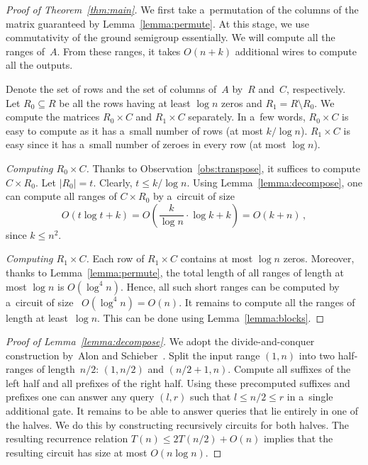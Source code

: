 \documentclass[11pt,letterpaper]{article}
\begin{document}
\begin{proof}[Proof of Theorem~\ref{thm:main}]
We first take a~permutation of the columns of the matrix
guaranteed by Lemma~\ref{lemma:permute}. At this stage,
we use commutativity of the ground semigroup essentially.
We will compute all the ranges of~$A$. From these ranges,
it takes $O(n+k)$ additional wires to compute all the outputs.

Denote the set of rows and the set of columns of~$A$ by~$R$
and~$C$, respectively. Let $R_0 \subseteq R$ be all the rows
having at least $\log n$ zeros and $R_1=R \setminus R_0$. We
compute the matrices $R_0 \times C$ and $R_1 \times C$
separately. In a~few words, $R_0 \times C$ is easy to compute
as it has a~small number of rows (at most $k/\log n$). $R_1 \times C$ is easy since it has a~small number of zeroes in
every row (at most $\log n$).

\emph{Computing $R_0 \times C$.} Thanks to
Observation~\ref{obs:transpose}, it suffices
to compute $C \times R_0$.
Let $|R_0|=t$. Clearly, $t \le k/\log n$.
Using Lemma~\ref{lemma:decompose}, one can compute all
ranges of $C \times R_0$ by a~circuit of size
\[O(t\log t+k)=O\left(\frac{k}{\log n} \cdot \log k+k\right)=O(k+n)\, ,\]
since $k \le n^2$.

\emph{Computing $R_1 \times C$.} Each row of
$R_1 \times C$ contains at most $\log n$ zeros. Moreover,
thanks to Lemma~\ref{lemma:permute}, the total length of all
ranges of length at most $\log n$ is $O(\log^4n)$. Hence, all
such short ranges can be computed by a~circuit of size~
$O(\log^4n)=O(n)$. It remains to compute all the ranges of
length at least~$\log n$. This can be done using Lemma~\ref{lemma:blocks}.
\end{proof}

\begin{proof}[Proof of Lemma~\ref{lemma:decompose}]
We adopt the divide-and-conquer construction by~Alon and Schieber~\cite{Alon87optimalpreprocessing}.
Split the input range $(1,n)$ into two half-ranges of
length~$n/2$:
$(1,n/2)$ and $(n/2+1,n)$.
Compute all suffixes of the left half and all prefixes of
the right half.
Using these precomputed suffixes and
prefixes one can answer any query $(l,r)$ such that $l \le n/2
\le r$ in a~single additional gate. It remains to be able to answer
queries that lie entirely in one of the halves. We do this by
constructing recursively circuits for both halves. The resulting
recurrence relation $T(n) \le 2T(n/2)+O(n)$ implies that the
resulting circuit has size at most $O(n\log n)$.
\end{proof}
\end{document}
